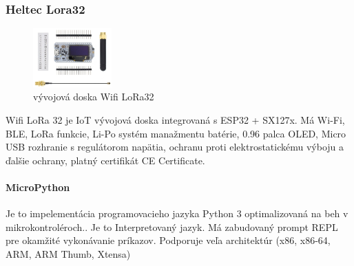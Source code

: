 

\pagebreak
 \subsubsection{Heltec Lora32}

\begin{figure}
    \centering
    \includegraphics[width=0.27\textwidth]{images/heltec_lora32.jpg}
    \caption{ vývojová doska Wifi LoRa32  }
\end{figure}
Wifi LoRa 32 je IoT vývojová doska integrovaná s ESP32 + SX127x. Má Wi-Fi, BLE, LoRa funkcie, Li-Po systém manažmentu batérie, 0.96 palca OLED, Micro USB rozhranie s regulátorom napätia, ochranu proti elektrostatickému výboju a ďalšie ochrany, platný certifikát CE Certificate\cite{heltec_lora32}.
\paragraph{MicroPython}
Je to impelementácia programovacieho jazyka Python 3 optimalizovaná na beh v mikrokontroléroch.\cite{micropython_pcrevue}. Je to Interpretovaný jazyk. Má zabudovaný prompt REPL pre okamžité vykonávanie príkazov. Podporuje veľa architektúr (x86, x86-64, ARM, ARM Thumb, Xtensa)\cite{micropython}






